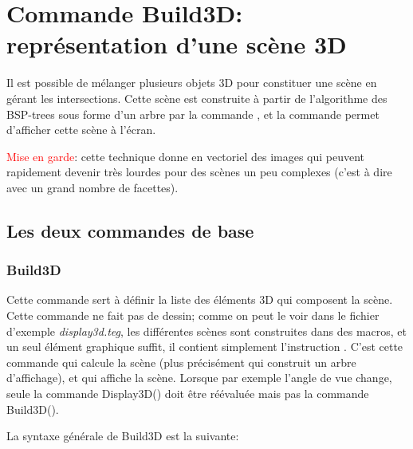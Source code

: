 \chapter[Scène 3D]{Commande Build3D: représentation d'une scène 3D}\label{chapBuild3D}

Il est possible de mélanger plusieurs objets 3D pour constituer une scène en gérant les intersections. Cette scène est construite à partir de l'algorithme des BSP-trees sous forme d'un arbre par la commande , et la commande  permet d'afficher cette scène à l'écran. 


\textcolor{red}{Mise en garde}: cette technique donne en vectoriel des images qui peuvent rapidement devenir très lourdes pour des scènes un peu complexes (c'est à dire avec un grand nombre de facettes).

\section{Les deux commandes de base}

\subsection{Build3D}\label{cmdBuild3D}

Cette commande sert à définir la liste des éléments 3D qui composent la scène. Cette commande ne fait pas de dessin; comme on peut le voir dans le fichier d'exemple \textit{display3d.teg}, les différentes scènes sont construites dans des macros, et un seul élément graphique suffit, il contient simplement l'instruction . C'est cette commande qui calcule la scène (plus précisément qui construit un arbre d'affichage), et qui affiche la scène. Lorsque par exemple l'angle de vue change, seule la commande Display3D() doit être réévaluée mais pas la commande Build3D().

La syntaxe générale de Build3D est la suivante:


